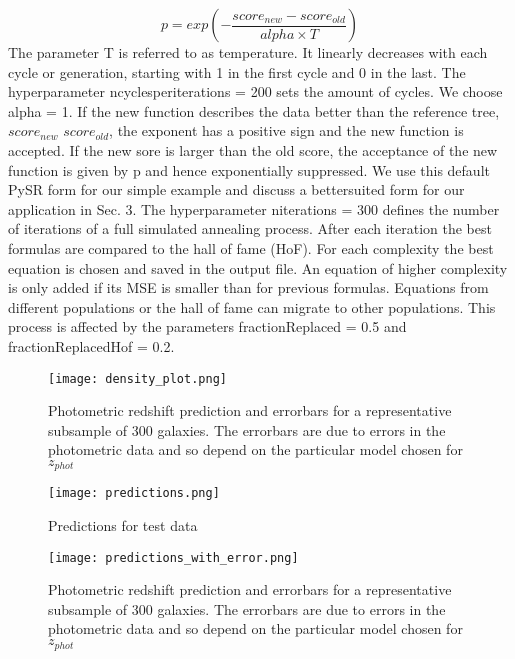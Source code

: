 \begin{equation}
	p = exp\left( - \frac{score_{new} - score_{old}}{alpha\times T} \right)
\end{equation}
The parameter T is referred to as temperature. It linearly decreases with each cycle or generation, starting with 1 in the first cycle and 0 in the last. The hyperparameter ncyclesperiterations = 200 sets the amount of cycles. We choose alpha = 1. If the new function describes the data better than the reference tree, $score_{new}$ $score_{old}$, the exponent has a positive sign and the new function is accepted. If the new sore is larger than the old score, the acceptance of the new function is given by p and hence exponentially suppressed. We use this default PySR form for our simple example and discuss a bettersuited form for our application in Sec. 3. The hyperparameter niterations = 300 defines the number of iterations of a full simulated annealing process. After each iteration the best formulas are compared to the hall of fame (HoF). For each complexity the best equation is chosen and saved in the output file. An equation of higher complexity is only added if its MSE is smaller than for previous formulas. Equations from different populations or the hall of fame can migrate to other populations. This process is affected by the parameters fractionReplaced = 0.5 and fractionReplacedHof = 0.2.
\begin{figure}
	\centering
	\texttt{[image: density\_plot.png]}
	\caption{Photometric redshift prediction and errorbars for a representative subsample of 300 galaxies. The errorbars are due to errors in the photometric data and so depend on the particular model chosen for $z_{phot}$}
	\label{fig:density_plot}
\end{figure}
\begin{figure}
	\centering
	\texttt{[image: predictions.png]}
	\caption{Predictions for test data}
	\label{fig:predictions}
\end{figure}
\begin{figure}
	\centering
	\texttt{[image: predictions\_with\_error.png]}
	\caption{Photometric redshift prediction and errorbars for a representative subsample of 300 galaxies. The errorbars are due to errors in the photometric data and so depend on the particular model chosen for $z_{phot}$}
	\label{fig:predictions_with_error}
\end{figure}